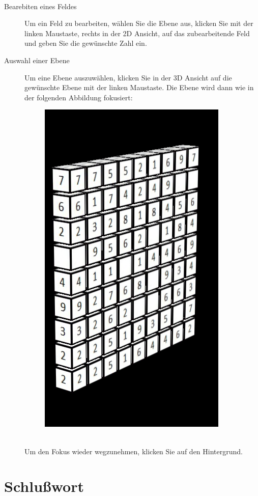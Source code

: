 \documentclass[a4paper,12pt]{scrreprt}
\begin{document}
\begin{description}
\begin{figure}[h]
			\end{figure}\\
		\item[Bearebiten eines Feldes] Um ein Feld zu bearbeiten, w\"ahlen Sie die Ebene aus, klicken Sie mit der linken
			Maustaste, rechts in der 2D Ansicht, auf das zubearbeitende Feld und geben Sie die gew\"unschte Zahl ein.
		\item[Auswahl einer Ebene] Um eine Ebene auszuw\"ahlen, klicken Sie in der 3D Ansicht auf die gew\"unschte
			Ebene mit der linken Maustaste. Die Ebene wird dann wie in der folgenden Abbildung fokusiert:\\
			\begin{figure}[h]
				\includegraphics[scale=0.7]{pictures/layerfocus_example}
			\end{figure}\\
			Um den Fokus wieder wegzunehmen, klicken Sie auf den Hintergrund.
	\end{description}

	\chapter{Schlu{\ss}wort}
\end{document}
